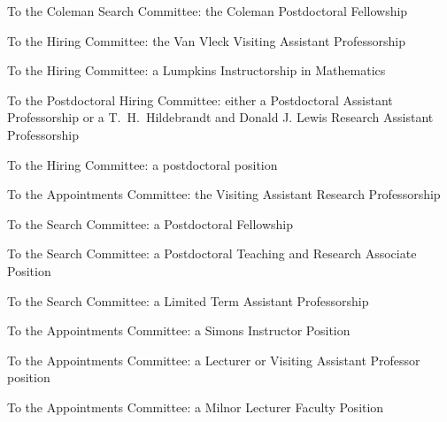 \documentclass[11pt]{letter}
\begin{document}
\coverletter
  {\queens}
  {To the Coleman Search Committee:}
  {the Coleman Postdoctoral Fellowship}
  {\mathjobs}
  {}
  {}
  {\nopublications}

\coverletter
  {\wisconsin}
  {To the Hiring Committee:}
  {the Van Vleck Visiting Assistant Professorship}
  {\mathjobs}
  {}
  {}
  {\generic}

\coverletter
	{\unotredame}
	{To the Hiring Committee:}
	{a Lumpkins Instructorship in Mathematics}
	{\mathjobs}
	{}
	{}
	{\generic}

\coverletter
  {\umich}
  {To the Postdoctoral Hiring Committee:}
  {either a Postdoctoral Assistant Professorship or a T.~H.~Hildebrandt and Donald J. Lewis Research Assistant Professorship}
  {\mathjobs}
  {}
  {}
  {\generic}

\coverletter
	{\msu}
	{To the Hiring Committee:}
	{a postdoctoral position}
	{\mathjobs}
	{}
	{}
	{\nopublications}

\coverletter
  {\duke}
  {To the Appointments Committee:}
  {the Visiting Assistant Research Professorship}
  {\mathjobs}
  {}
  {}
  {\noteachingnopub}

\coverletter
  {\utoronto}
  {To the Search Committee:}
  {a Postdoctoral Fellowship}
  {\mathjobs}
  {}
  {}
  {\generic}

\coverletter
	{\ugeorgia}
	{To the Search Committee:}
	{a Postdoctoral Teaching and Research Associate Position}
	{\mathjobs}
	{}
	{}
	{\generic}

\coverletter
	{\ugeorgia}
	{To the Search Committee:}
	{a Limited Term Assistant Professorship}
	{\mathjobs}
	{}
	{}
	{\generic}

\coverletter
  {\stonybrook}
  {To the Appointments Committee:}
  {a Simons Instructor Position}
  {\mathjobs}
  {}
  {}
  {\generic}

\coverletter
  {\stonybrook}
  {To the Appointments Committee:}
  {a Lecturer or Visiting Assistant Professor position}
  {\mathjobs}
  {}
  {}
  {\generic}

\coverletter
  {\stonybrook}
  {To the Appointments Committee:}
  {a Milnor Lecturer Faculty Position}
  {\mathjobs}
  {}
  {}
  {\generic}
\end{document}
